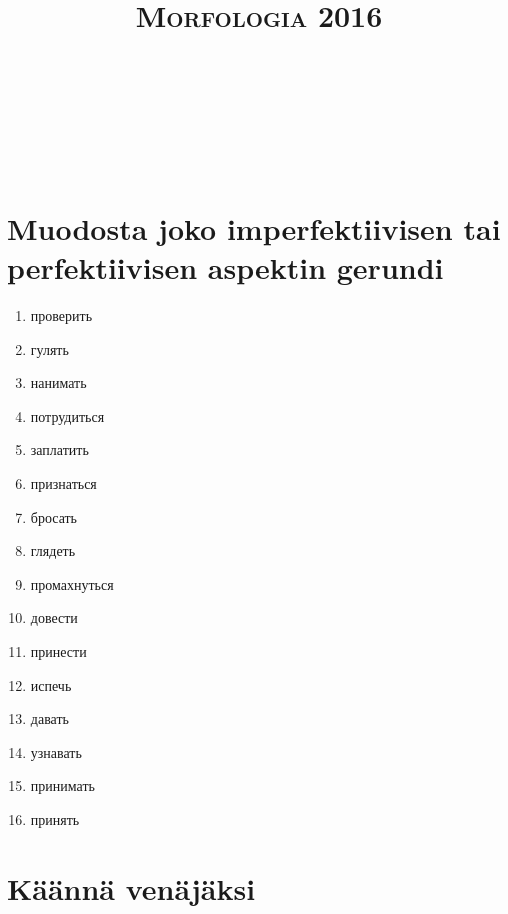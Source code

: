 \documentclass[paper=a4, fontsize=11pt]{scrartcl}
\title{	
\normalfont \normalsize 
\textsc{Morfologia 2016} \\ [25pt] %
\horrule{0.5pt} \\[0.4cm] %
\huge  \\ %
\horrule{2pt} \\[0.5cm] %
}
\date{} %
\begin{document}
\section{Muodosta joko imperfektiivisen tai perfektiivisen aspektin gerundi}

\begin{enumerate}
    \item  проверить
    \item  гулять
    \item  нанимать
    \item  потрудиться
    \item  заплатить
    \item  признаться
    \item  бросать
    \item  глядеть
    \item  промахнуться
    \item  довести
    \item  принести
    \item  испечь
    \item  давать
    \item  узнавать
    \item  принимать
    \item  принять
\end{enumerate}


\section{Käännä venäjäksi}
\end{document}
